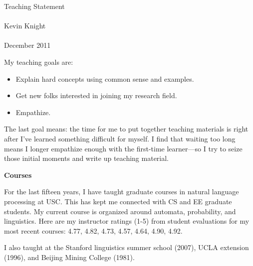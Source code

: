 


\newcommand{\hd}[1]{
\vspace*{0.2in} 
\noindent 
{\bf \Large #1}
\hspace{0.1in}
\vspace*{0.2in}}



\begin{Large}
\begin{center}
Teaching Statement \\
\hspace{1mm} \\
Kevin Knight \\
\hspace{1mm} \\
December 2011
\end{center}
\end{Large}

\vspace{0.1in}

\noindent
My teaching goals are:

\begin{itemize}
\item Explain hard concepts using common sense and examples.
\item Get new folks interested in joining my research field.
\item Empathize.
\end{itemize}

\noindent
The last goal means: the time for me to put together teaching 
materials is right after I've learned something difficult for myself.
I find that waiting too long means I
longer empathize enough with the first-time learner---so I try to 
seize those initial moments and write up teaching material.

\hd{Courses}

\noindent
For the last fifteen years, I have taught graduate courses in 
natural language processing at USC.  This has kept me connected with 
CS and EE graduate students.  My current course is organized around 
automata, probability, and linguistics. 
Here are my instructor ratings (1-5) from student evaluations for my
most recent courses: 4.77, 4.82, 4.73, 4.57, 4.64, 4.90, 4.92.

I also taught at the Stanford linguistics summer school 
(2007), UCLA extension (1996), and Beijing Mining College (1981).

